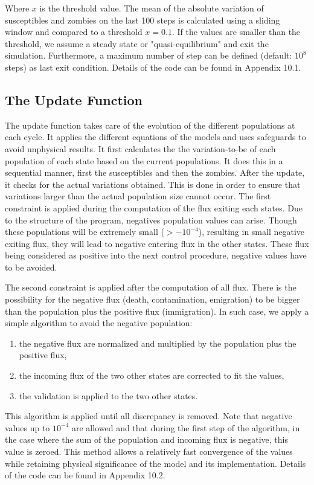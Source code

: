 \documentclass[11pt]{article} %
\begin{document}
Where $x$ is the threshold value. The mean of the absolute variation of susceptibles and zombies on the last 100 steps is calculated using a sliding window and compared to a threshold $x = 0.1$. If the values are smaller than the threshold, we assume a steady state or "quasi-equilibrium" and exit the simulation. Furthermore, a maximum number of step can be defined (default: $10^8$ steps) as last exit condition. Details of the code can be found in Appendix 10.1.

\subsection{The Update Function}\indent

The update function takes care of the evolution of the different populations at each cycle. It applies the different equations of the models and uses safeguards to avoid unphysical results. It first calculates the the variation-to-be of each population of each state based on the current populations. It does this in a sequential manner, first the susceptibles and then the zombies. After the update, it checks for the actual variations obtained. This is done in order to ensure that variations larger than the actual population size cannot occur.
The first constraint is applied during the computation of the flux exiting each states. Due to the structure of the program, negatives population values can arise. Though these populations will be extremely small ($> - 10^{-4}$), resulting in small negative exiting flux, they will lead to negative entering flux in the other states. These flux being considered as positive into the next control procedure, negative values have to be avoided.

The second constraint is applied after the computation of all flux. There is the possibility for the negative flux (death, contamination, emigration) to be bigger than the population plus the positive flux (immigration). In such case, we apply a simple algorithm to avoid the negative population:
\begin{enumerate}
	\item the negative flux are normalized and multiplied by the population plus the positive flux,
	\item the incoming flux of the two other states are corrected to fit the values,
	\item the validation is applied to the two other states.
\end{enumerate}
This algorithm is applied until all discrepancy is removed. Note that negative values up to $10^{-4}$ are allowed and that during the first step of the algorithm, in the case where the sum of the population and incoming flux is negative, this value is zeroed. This method allows a relatively fast convergence of the values while retaining physical significance of the model and its implementation. Details of the code can be found in Appendix 10.2.
\end{document}
